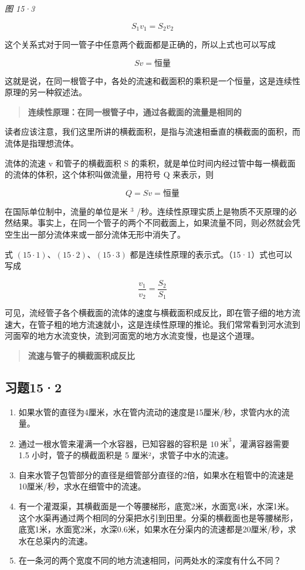 \emph{图 15·3}

\[
S _ {1} v _ {1} = S _ {2} v _ {2} \tag {15.1}
\]

这个关系式对于同一管子中任意两个截面都是正确的，所以上式也可以写成

\[
S v = \text{恒量} \tag {15.2}
\]

这就是说，在同一根管子中，各处的流速和截面积的乘积是一个恒量，这是连续性原理的另一种叙述法。

\begin{quote}
\textbf{连续性原理：在同一根管子中，通过各截面的流量是相同的}
\end{quote}

读者应该注意，我们这里所讲的横截面积，是指与流速相垂直的横截面的面积，而流体是指理想流体。

流体的流速 v 和管子的横截面积 S
的乘积，就是单位时间内经过管中每一横截面的流体的体积，这个体积叫做流量，用符号
Q 来表示，则

\[
Q = S v = \text{恒量} \tag {15.3}
\]

在国际单位制中，流量的单位是米 \(^{3}\)
/秒。连续性原理实质上是物质不灭原理的必然结果。事实上，在同一个管子的两个不同截面上，如果流量不同，则必然就会凭空生出一部分流体来或一部分流体无形中消失了。

式 \((15\cdot1)\)、\((15\cdot2)\)、\((15\cdot3)\)
都是连续性原理的表示式。（15·1）式也可以写成

\[
\frac {v _ {1}}{v _ {2}} = \frac {S _ {2}}{S _ {1}} \tag {15.4}
\]

可见，流经管子各个横截面的流体的速度与横截面积成反比，即在管子细的地方流速大，在管子粗的地方流速就小，这是连续性原理的推论。我们常常看到河水流到河面窄的地方水流变快，流到河面宽的地方水流变慢，也是这个道理。

\begin{quote}
\textbf{流速与管子的横截面积成反比}
\end{quote}

\subsection{习题15·2}\label{ux4e60ux9898152}

\begin{enumerate}
\def\labelenumi{\arabic{enumi}.}
\item
  如果水管的直径为4厘米，水在管内流动的速度是15厘米/秒，求管内水的流量。
\item
  通过一根水管来灌满一个水容器，已知容器的容积是
  \(10 \mathrm{~米}^{3}\)，灌满容器需要 1.5 小时，管子的横截面积是 5
  厘米²，求管子中水的流速。
\item
  自来水管子包管部分的直径是细管部分直径的2倍，如果水在粗管中的流速是10厘米/秒，求水在细管中的流速。
\item
  有一个灌溉渠，其横截面是一个等腰梯形，底宽2米，水面宽4米，水深1米。这个水渠再通过两个相同的分渠把水引到田里。分渠的横截面也是等腰梯形，底宽1米，水面宽2米，水深0.6米，如果水在分渠内的流速都是20厘米/秒，求水在总渠内的流速。
\item
  在一条河的两个宽度不同的地方流速相同，问两处水的深度有什么不同？
\end{enumerate}

